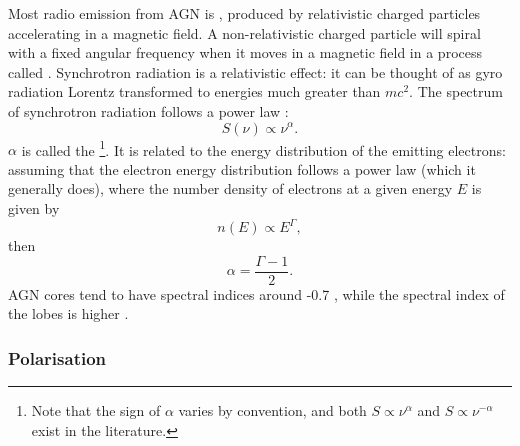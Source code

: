         Most radio emission from AGN is , produced by relativistic charged particles accelerating in a magnetic field. A non-relativistic charged particle will spiral with a fixed angular frequency when it moves in a magnetic field in a process called . Synchrotron radiation is a relativistic effect: it can be thought of as gyro radiation Lorentz transformed to energies much greater than $mc^2$. The spectrum of synchrotron radiation follows a power law \citep{condon_essential_2016}:
        \begin{equation}
            \label{eq:spectral-index}
            S(\nu) \propto \nu^{\alpha}.
        \end{equation}
        $\alpha$ is called the \footnote{Note that the sign of $\alpha$ varies by convention, and both $S \propto \nu^{\alpha}$ and $S \propto \nu^{-\alpha}$ exist in the literature.}. It is related to the energy distribution of the emitting electrons: assuming that the electron energy distribution follows a power law (which it generally does\citeneeded), where the number density of electrons at a given energy $E$ is given by
        \begin{equation}
            n(E) \propto E^\Gamma,
        \end{equation}
        then
        \begin{equation}
            \alpha = \frac{\Gamma - 1}{2}.
        \end{equation}
        AGN cores tend to have spectral indices around -0.7 \citeneeded, while the spectral index of the lobes is higher \citeneeded.


        \subsubsection{Polarisation}
        \label{sec:polarisation}

